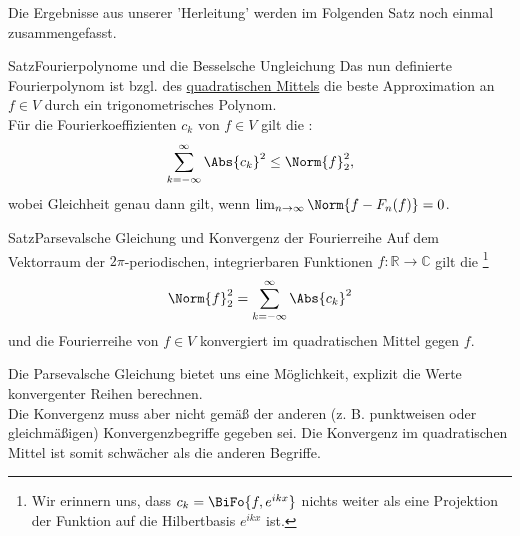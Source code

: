 Die Ergebnisse aus unserer 'Herleitung' werden im Folgenden Satz noch einmal zusammengefasst.
\begin{Satz}
{Satz}{Fourierpolynome und die Besselsche Ungleichung}
Das nun definierte Fourierpolynom ist bzgl. des \underline{quadratischen Mittels} die beste Approximation an $f\in V$ durch ein trigonometrisches Polynom.\\
Für die Fourierkoeffizienten $c_k$ von $f\in V$ gilt die :
\begin{equation}
    \sum_{k=-\infty}^\infty\Abs{c_k}^2\leq\Norm{f}_2^2,
\end{equation}
wobei Gleichheit genau dann gilt, wenn $\lim_{n\to\infty}\Norm{f-F_n(f)}=0$.
\end{Satz}
\begin{Satz}
{Satz}{Parsevalsche Gleichung und Konvergenz der Fourierreihe}
Auf dem Vektorraum der $2\pi$-periodischen, integrierbaren Funktionen $f:\mathbb{R}\to\mathbb{C}$ gilt die \footnote{Wir erinnern uns, dass $c_k=\BiFo{f, e^{ikx}}$ nichts weiter als eine Projektion der Funktion auf die Hilbertbasis $e^{ikx}$ ist.}
\begin{equation}
    \Norm{f}_2^2=\sum_{k=-\infty}^\infty\Abs{c_k}^2
\end{equation}
und die Fourierreihe von $f\in V$ konvergiert im quadratischen Mittel gegen $f$.
\end{Satz}
Die Parsevalsche Gleichung bietet uns eine Möglichkeit, explizit die Werte konvergenter Reihen berechnen.\\
Die Konvergenz muss aber nicht gemäß der anderen (z. B. punktweisen oder gleichmäßigen) Konvergenzbegriffe gegeben sei. Die Konvergenz im quadratischen Mittel ist somit schwächer als die anderen Begriffe.

